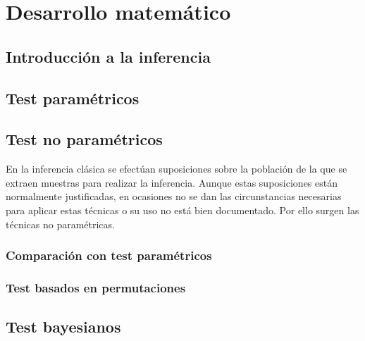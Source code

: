 %
%


\chapter{Desarrollo matemático}

\section{Introducción a la inferencia}
		
	
	
\section{Test paramétricos}

	
	
	

\section{Test no paramétricos}

	En la inferencia clásica se efectúan suposiciones sobre la población de la que se extraen muestras para realizar la inferencia. Aunque estas suposiciones están normalmente justificadas, en ocasiones no se dan las circunstancias necesarias para aplicar estas técnicas o su uso no está bien documentado. Por ello surgen las técnicas no paramétricas.
	
	\subsection*{Comparación con test paramétricos}
		

	
	
	

	\subsection{Test basados en permutaciones}

\section{Test bayesianos}	
%